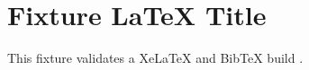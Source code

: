 \documentclass{article}
\begin{document}
\section*{Fixture LaTeX Title}
This fixture validates a XeLaTeX and BibTeX build \cite{Fixture2026Fixture}.


\end{document}
